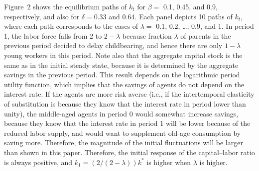 \documentclass{MBE}%
\begin{document}
{%

Figure~2 shows the equilibrium paths of $k_{t}$ for $\beta=$ 0.1, 0.45, and 0.9, respectively, and
also for $\delta=0.33$ and 0.64. Each panel depicts 10 paths of $k_{t}$, where each path
corresponds to the cases of $\lambda=$ 0.1, 0.2, \dots, 0.9, and 1. In period 1, the labor force
falls from 2 to $2-\lambda$ because fraction $\lambda$ of parents in the previous period decided
to delay childbearing, and hence there are only $1-\lambda$ young workers in this period. Note
also that the aggregate capital stock is the same as in the initial steady state, because it is
determined by the aggregate savings in the previous period. {This result depends on the
logarithmic period utility function, which implies that the savings of agents do not depend on the
interest rate. If the agents are more risk averse (i.e., if the intertemporal elasticity of
substitution is because they know that the interest rate in period lower than unity), the
middle-aged agents in period 0 would somewhat increase savings, because they know that the
interest rate in period 1 will be lower because of the reduced labor supply, and would want to
supplement old-age consumption by saving more. Therefore, the magnitude of the initial
fluctuations will be larger than shown in this paper.} Therefore, the initial response of the
capital--labor ratio is always positive, and $k_{1}=\left( 2/(2-\lambda)\right)  k^{*}$ is higher
when $\lambda$ is higher.

}
\end{document}
